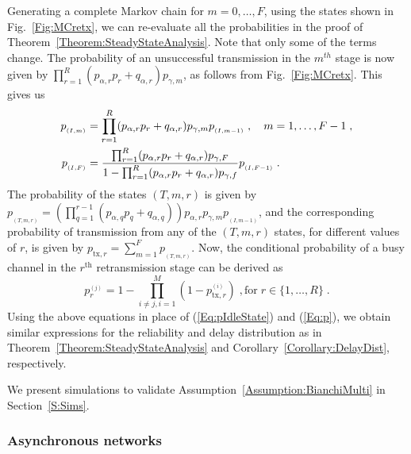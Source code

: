 \documentclass[journal]{IEEEtran}
\begin{document}
Generating a complete Markov chain for $m=0,\dots,F$, using the states shown in Fig.~\ref{Fig:MCretx}, we can re-evaluate all the probabilities in the proof of Theorem~\ref{Theorem:SteadyStateAnalysis}. Note that only some of the terms change. The probability of an unsuccessful transmission in the $m^{th}$ stage is now given by $\prod_{r=1}^{R} (p_{\alpha,r} p_r + q_{\alpha,r}) p_{\gamma,m}$, as follows from Fig.~\ref{Fig:MCretx}. This gives us
\begin{align*}
p_{_{(I,m)}} &= \prod_{r=1}^R (p_{\alpha,r} p_r + q_{\alpha,r}) p_{\gamma,m} p_{_{(I,m-1)}} \; , \quad m = 1,\dots,F-1 \; , \notag \\
p_{_{(I,F)}} &= \frac{\prod_{r=1}^R (p_{\alpha,r} p_r + q_{\alpha,r}) p_{\gamma,F}}{1-\prod_{r=1}^R (p_{\alpha,r} p_r + q_{\alpha,r}) p_{\gamma,f}} p_{_{(I,F-1)}} \; .
\end{align*}
The probability of the states $(T,m,r)$ is given by $p_{_{(T,m,r)}} = (\prod_{q=1}^{r-1} (p_{\alpha,q} p_q + q_{\alpha,q})) p_{\alpha,r} p_{\gamma,m} p_{_{(I,m-1)}}$, and the corresponding probability of transmission from any of the $(T,m,r)$ states, for different values of $r$, is given by $p_{\mathrm{tx},r} = \sum_{m=1}^F p_{_{(T,m,r)}}$. Now, the conditional probability of a busy channel in the $r^{\textrm{th}}$ retransmission stage can be derived as
\begin{equation} \label{Eq:pRetx}
p^{_{(j)}}_r = 1-\prod_{i \neq j,i=1}^{M} (1-p_{\mathrm{tx},r}^{_{(i)}}) \; , \text{for} \; r \in \{1,\dots,R\} \; .
\end{equation}
Using the above equations in place of (\ref{Eq:pIdleState}) and (\ref{Eq:p}), we obtain similar expressions for the reliability and delay distribution as in Theorem~\ref{Theorem:SteadyStateAnalysis} and Corollary~\ref{Corollary:DelayDist}, respectively.

We present simulations to validate Assumption~\ref{Assumption:BianchiMulti} in Section~\ref{S:Sims}.

\subsubsection{Asynchronous networks}
\end{document}
